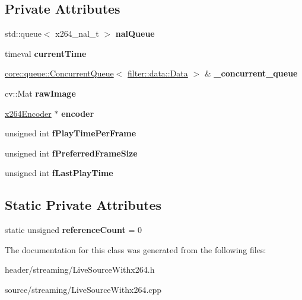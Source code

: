 \subsection*{Private Attributes}
\begin{DoxyCompactItemize}
\item 
\mbox{\label{class_live_source_withx264_a10d048c437a4d2f0cd7a68590c3785cf}} 
std\+::queue$<$ x264\+\_\+nal\+\_\+t $>$ {\bfseries nal\+Queue}
\item 
\mbox{\label{class_live_source_withx264_ad03f61c26ac91170112c6c7dc0d5654e}} 
timeval {\bfseries current\+Time}
\item 
\mbox{\label{class_live_source_withx264_ad3467fbf554da264ca78e9d1ef8694cc}} 
\hyperlink{classcore_1_1queue_1_1_concurrent_queue}{core\+::queue\+::\+Concurrent\+Queue}$<$ \hyperlink{classfilter_1_1data_1_1_data}{filter\+::data\+::\+Data} $>$ \& {\bfseries \+\_\+concurrent\+\_\+queue}
\item 
\mbox{\label{class_live_source_withx264_aa517849abd04dadfb9109b0d586a156b}} 
cv\+::\+Mat {\bfseries raw\+Image}
\item 
\mbox{\label{class_live_source_withx264_a930c139bbfc221d3bfa3603c95b73d03}} 
\hyperlink{classx264_encoder}{x264\+Encoder} $\ast$ {\bfseries encoder}
\item 
\mbox{\label{class_live_source_withx264_a3aebee8498fb816040dacaa9d95d7227}} 
unsigned int {\bfseries f\+Play\+Time\+Per\+Frame}
\item 
\mbox{\label{class_live_source_withx264_af1512208932b914bb964cfd049ca4283}} 
unsigned int {\bfseries f\+Preferred\+Frame\+Size}
\item 
\mbox{\label{class_live_source_withx264_ac4ff9b055617e218123a5571d989f85c}} 
unsigned int {\bfseries f\+Last\+Play\+Time}
\end{DoxyCompactItemize}
\subsection*{Static Private Attributes}
\begin{DoxyCompactItemize}
\item 
\mbox{\label{class_live_source_withx264_a04bbbfe8163fa6f6e9dc00a5e2f530aa}} 
static unsigned {\bfseries reference\+Count} = 0
\end{DoxyCompactItemize}


The documentation for this class was generated from the following files\+:\begin{DoxyCompactItemize}
\item 
header/streaming/Live\+Source\+Withx264.\+h\item 
source/streaming/Live\+Source\+Withx264.\+cpp\end{DoxyCompactItemize}
